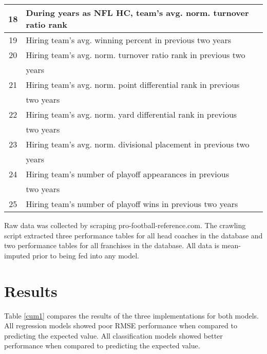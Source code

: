 \documentclass[conference]{IEEEtran}
\begin{document}
\begin{table}[htbp]
\begin{center}
\begin{tabular}{|c||l|}
\hline
18 & During years as NFL HC, team’s avg. norm. turnover ratio rank \\
\hline
19 & Hiring team’s avg. winning percent in previous two years \\
\hline
20 & Hiring team’s avg. norm. turnover ratio rank in previous two \\
&years \\
\hline
21 & Hiring team’s avg. norm. point differential rank in previous\\
& two years \\
\hline
22 & Hiring team’s avg. norm. yard differential rank in previous\\
&two years \\
\hline
23 & Hiring team’s avg. norm. divisional placement in previous two\\
&years \\
\hline
24 & Hiring team’s number of playoff appearances in previous\\
&two years \\
\hline
25 & Hiring team’s number of playoff wins in previous two years \\
\hline
\end{tabular}
\label{tab1}
\end{center}
\end{table}

Raw data was collected by scraping pro-football-reference.com. The crawling script extracted three performance tables for all head coaches in the database and two performance tables for all franchises in the database. All data is mean-imputed prior to being fed into any model.


\section{Results}
Table \ref{cum1} compares the results of the three implementations for both models. All regression models showed poor RMSE performance when compared to predicting the expected value. All classification models showed better performance when compared to predicting the expected value.
\end{document}
